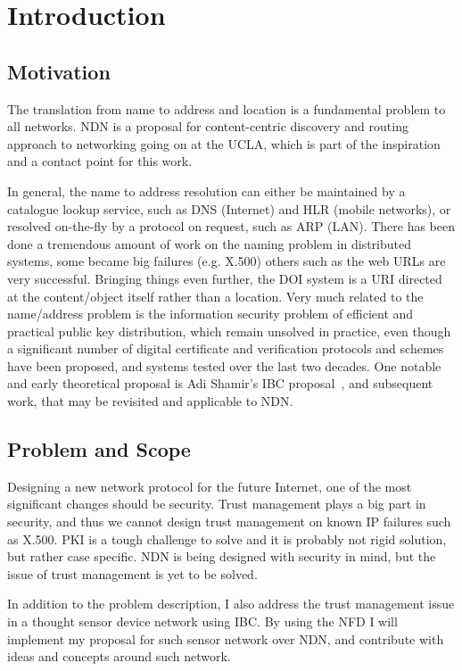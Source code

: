 \chapter{Introduction}\label{chp:introduction} 

\section{Motivation}
The translation from name to address and location is a fundamental problem to all networks.
\gls{NDN} is a proposal for content-centric discovery and routing approach to networking
going on at the \gls{UCLA}, which is part of the inspiration and a contact point for this work.

In general, the name to address resolution can either be maintained by a catalogue lookup service, 
such as \gls{DNS} (Internet) and \gls{HLR} (mobile networks), 
or resolved on-the-fly by a protocol on request, such as \gls{ARP} (\gls{LAN}). 
There has been done a tremendous amount of work on the naming problem in distributed systems, 
some became big failures (e.g. X.500) others such as the web \gls{URL}s are very successful. 
Bringing things even further, the \gls{DOI} system is a \gls{URI} directed at the content/object itself rather than a location. 
Very much related to the name/address problem is the information security problem of efficient and practical public key distribution, 
which remain unsolved in practice, even though a significant number of digital certificate and verification protocols and schemes have been proposed, and systems tested over the last two decades. 
One notable and early theoretical proposal is Adi Shamir's \gls{IBC} proposal~\cite{DBLP:conf/crypto/Shamir84},
and subsequent work, that may be revisited and applicable to \gls{NDN}.

\section{Problem and Scope}

Designing a new network protocol for the future Internet, one of the most significant changes should be security.
Trust management plays a big part in security, and thus we cannot design trust management on known \gls{IP} failures such as X.500. 
\gls{PKI} is a tough challenge to solve and it is probably not rigid solution, but rather case specific.
\gls{NDN} is being designed with security in mind, but the issue of trust management is yet to be solved.

In addition to the problem description, I also address the trust management issue in a thought sensor device network using \gls{IBC}.
By using the \gls{NFD} I will implement my proposal for such sensor network over \gls{NDN}, and contribute with ideas and concepts around such network.


